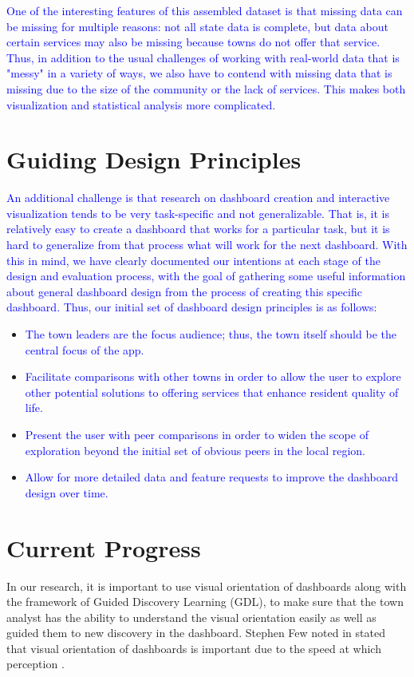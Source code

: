 \documentclass[10pt]{article}\usepackage[]{graphicx}\usepackage[]{color}
\newcommand{\svp}[1]{{\textcolor{blue}{#1}}}
\begin{document}
\svp{One of the interesting features of this assembled dataset is that missing data can be missing for multiple reasons: not all state data is complete, but data about certain services may also be missing because towns do not offer that service.}
\svp{Thus, in addition to the usual challenges of working with real-world data that is "messy" in a variety of ways, we also have to contend with missing data that is missing due to the size of the community or the lack of services. This makes both visualization and statistical analysis more complicated.}

\section{Guiding Design Principles}
\svp{An additional challenge is that research on dashboard creation and interactive visualization tends to be very task-specific and not generalizable. That is, it is relatively easy to create a dashboard that works for a particular task, but it is hard to generalize from that process what will work for the next dashboard. With this in mind, we have clearly documented our intentions at each stage of the design and evaluation process, with the goal of gathering some useful information about general dashboard design from the process of creating this specific dashboard.}
\svp{Thus, our initial set of dashboard design principles is as follows: }
\begin{itemize}
\item \svp{The town leaders are the focus audience; thus, the town itself should be the central focus of the app.}
\item \svp{Facilitate comparisons with other towns in order to allow the user to explore other potential solutions to offering services that enhance resident quality of life.}
\item \svp{Present the user with peer comparisons in order to widen the scope of exploration beyond the initial set of obvious peers in the local region.}
\item \svp{Allow for more detailed data and feature requests to improve the dashboard design over time.}
\end{itemize}


\section{Current Progress}
In our research, it is important to use visual orientation of dashboards along with the framework of Guided Discovery Learning (GDL), to make sure that the town analyst has the ability to understand the visual orientation easily as well as guided them to new discovery in the dashboard. 
Stephen Few noted in  stated that visual orientation of dashboards is important due to the speed at which perception \cite{few}.
\end{document}
